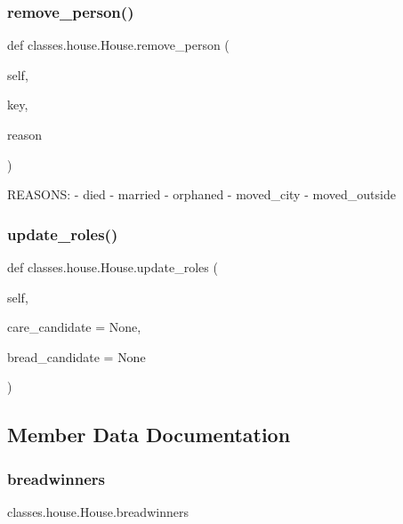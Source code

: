 \subsubsection{\texorpdfstring{remove\+\_\+person()}{remove\_person()}}
{\footnotesize\ttfamily def classes.\+house.\+House.\+remove\+\_\+person (\begin{DoxyParamCaption}\item[{}]{self,  }\item[{}]{key,  }\item[{}]{reason }\end{DoxyParamCaption})}

\begin{DoxyVerb}REASONS:
- died
- married
- orphaned
- moved_city
- moved_outside
\end{DoxyVerb}
 \mbox{\label{classclasses_1_1house_1_1House_ae622298a40f44c3c79789ddf932e3b9b}} 
\subsubsection{\texorpdfstring{update\+\_\+roles()}{update\_roles()}}
{\footnotesize\ttfamily def classes.\+house.\+House.\+update\+\_\+roles (\begin{DoxyParamCaption}\item[{}]{self,  }\item[{}]{care\+\_\+candidate = {\ttfamily None},  }\item[{}]{bread\+\_\+candidate = {\ttfamily None} }\end{DoxyParamCaption})}



\subsection{Member Data Documentation}
\mbox{\label{classclasses_1_1house_1_1House_acc9017378b83d3fb622aaf53e62da232}} 
\subsubsection{\texorpdfstring{breadwinners}{breadwinners}}
{\footnotesize\ttfamily classes.\+house.\+House.\+breadwinners}

